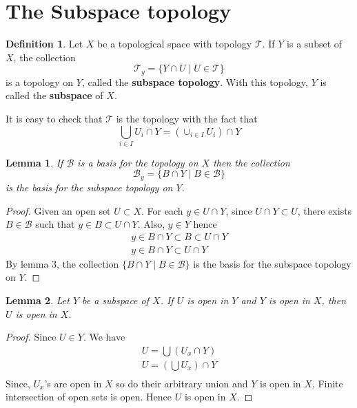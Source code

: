 \documentclass[12pt,reqno]{amsart}
\theoremstyle{plain}
\newtheorem{lem}{Lemma}
\theoremstyle{definition}
\newtheorem{defn}{Definition}
\newcommand{\cal}[1]{\mathcal{#1}}
\begin{document}
\section{The Subspace topology}
\begin{defn}
    Let $X$ be a topological space with topology $\cal T$. If $Y$ is a subset of $X$, the collection
    $$ \cal T_y = \{Y \cap U \mid U \in \cal T\} $$
    is a topology on $Y$, called the {\bf subspace topology}. With this topology, $Y$ is called the {\bf subspace} of $X$.
\end{defn}
It is easy to check that $\cal T$ is the topology with the fact that 
$$ \bigcup_{i \in I} U_i \cap Y = (\cup_{i \in I} U_i) \cap Y$$

\begin{lem}
    If $\cal B$ is a basis for the topology on $X$ then the collection 
    $$ \cal B_y = \{ B \cap Y \mid B \in \cal B\}$$
    is the basis for the subspace topology on $Y$.    
\end{lem}
\begin{proof}
    Given an open set $U \subset X$. For each $y \in U \cap Y$, since $U \cap Y \subset U$, there exists $B \in \cal B$ such that $y \in B \subset U \cap Y$. Also, $y \in Y$ hence
    $$
    \begin{array}{l}
        y \in B \cap Y \subset B \subset U \cap Y \\
        y \in B \cap Y \subset U \cap Y        
    \end{array} 
    $$
    By lemma $3$, the collection $\{B \cap Y \mid B \in \cal B\}$ is the basis for the subspace topology on $Y$.
\end{proof}
\begin{lem}
    Let $Y$ be a subspace of $X$. If $U$ is open in $Y$ and $Y$ is open in $X$, then $U$ is open in $X$.
\end{lem}
\begin{proof}
    Since $U \in Y$. We have 
    $$
    \begin{array}{l}
        U = \bigcup (U_x \cap Y) \\
        U = (\bigcup U_x) \cap Y \\        
    \end{array}
    $$
    Since, $U_x$'s are open in $X$ so do their arbitrary union and $Y$ is open in $X$. Finite intersection of open sets is open. Hence $U$ is open in $X$.
\end{proof}
\end{document}
